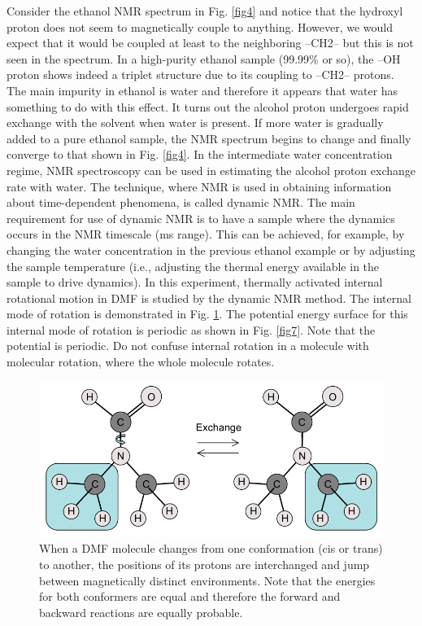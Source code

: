 \documentclass[byrevtex,amssymb,aps,pra,floatfix,letterpaper]{revtex4}
\begin{document}
Consider the ethanol NMR spectrum in Fig. \ref{fig4} and notice that the hydroxyl proton does not seem to magnetically couple to anything. However, we would expect that it would be coupled at least to the neighboring --CH2-- but this is not seen in the spectrum. In a high-purity ethanol sample (99.99\% or so), the --OH proton shows indeed a triplet structure due to its coupling to --CH2-- protons. The main impurity in ethanol is water and therefore it appears that water has something to do with this effect. It turns out the alcohol proton undergoes rapid exchange with the solvent when water is present. If more water is gradually added to a pure ethanol sample, the NMR spectrum begins to change and finally converge to that shown in Fig. \ref{fig4}. In the intermediate water concentration regime, NMR spectroscopy can be used in estimating the alcohol proton exchange rate with water. The technique, where NMR is used in obtaining information about time-dependent phenomena, is called dynamic NMR. The main requirement for use of dynamic NMR is to have a sample where the dynamics occurs in the NMR timescale (ms range). This can be achieved, for example, by changing the water concentration in the previous ethanol example or by adjusting the sample temperature (i.e., adjusting the thermal energy available in the sample to drive dynamics). In this experiment, thermally activated internal rotational motion in DMF is studied by the dynamic NMR method. The internal mode of rotation is demonstrated in Fig. \ref{fig6}. The potential energy surface for this internal mode of rotation is periodic as shown in Fig. \ref{fig7}. Note that the potential is periodic. Do not confuse internal rotation in a molecule with molecular rotation, where the whole molecule rotates.

\begin{figure}[!htp]
\begin{center}
\includegraphics[scale=0.5]{fig6}
\caption{When a DMF molecule changes from one conformation (cis or trans) to another, the positions of its protons are interchanged and jump between magnetically distinct environments. Note that the energies for both conformers are equal and therefore the forward and backward reactions are equally probable.}
\label{fig6}
\end{center}
\end{figure}
\end{document}
